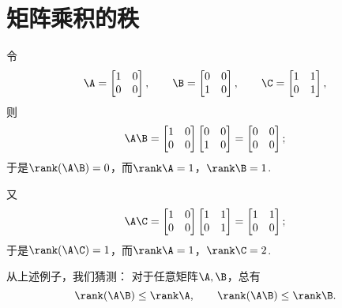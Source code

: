 \section{矩阵乘积的秩}
令\[
	\A=\begin{bmatrix}
		1 & 0 \\
		0 & 0
	\end{bmatrix}, \qquad
	\B=\begin{bmatrix}
		0 & 0 \\
		1 & 0
	\end{bmatrix}, \qquad
	\C=\begin{bmatrix}
		1 & 1 \\
		0 & 1
	\end{bmatrix},
\]
则\[
	\A\B=\begin{bmatrix}
		1 & 0 \\
		0 & 0
	\end{bmatrix}
	\begin{bmatrix}
		0 & 0 \\
		1 & 0
	\end{bmatrix}
	= \begin{bmatrix}
		0 & 0 \\
		0 & 0
	\end{bmatrix};
\]
于是\(\rank(\A\B)=0\)，而\(\rank\A=1\)，\(\rank\B=1\).

又\[
	\A\C=\begin{bmatrix}
		1 & 0 \\
		0 & 0
	\end{bmatrix}
	\begin{bmatrix}
		1 & 1 \\
		0 & 1
	\end{bmatrix}
	= \begin{bmatrix}
		1 & 1 \\
		0 & 0
	\end{bmatrix};
\]
于是\(\rank(\A\C)=1\)，而\(\rank\A=1\)，\(\rank\C=2\).

从上述例子，我们猜测：
对于任意矩阵\(\A,\B\)，总有\[
	\rank(\A\B) \leq \rank\A, \qquad
	\rank(\A\B) \leq \rank\B.
\]


